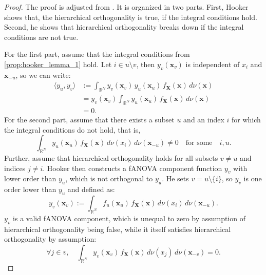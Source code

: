 \begin{proof}
    The proof is adjusted from \cite{hooker2007}. It is organized in two parts. First, Hooker shows that, the hierarchical orthogonality is true, if the integral conditions hold. Second, he shows that hierarchical orthogonality breaks down if the integral conditions are not true.\par
    For the first part, assume that the integral conditions from \autoref{prop:hooker_lemma_1} hold. Let $i \in u \setminus v$, then $y_v(\boldsymbol{x}_v)$ is independent of $x_i$ and $\boldsymbol{x}_{-u}$, so we can write:
\begin{align*}
\langle y_u, y_v \rangle 
&:= \int_{\mathbb{R}^N} 
        y_v(\boldsymbol{x}_v)\, y_u(\boldsymbol{x}_u)\, 
        f_{\boldsymbol{X}}(\boldsymbol{x})\, 
        d \nu(\boldsymbol{x}) \\[0.3em]
&= y_v(\boldsymbol{x}_v) 
   \int_{\mathbb{R}^N} 
        y_u(\boldsymbol{x}_u)\, 
        f_{\boldsymbol{X}}(\boldsymbol{x})\, 
        d \nu(\boldsymbol{x}) \\[0.3em]
&= 0.
\end{align*}
For the second part, assume that there exists a subset $u$ and an index $i$ for which the integral conditions do not hold, that is,
\begin{equation*}
    \int_{\mathbb{R}^N} y_u(\boldsymbol{x}_u)\, f_{\boldsymbol{X}}(\boldsymbol{x})\, d \nu (x_i)\, d \nu (\boldsymbol{x}_{-u}) \ne 0 
    \quad \text{for some} \quad i, u.
\end{equation*}
Further, assume that hierarchical orthogonality holds for all subsets $v \neq u$ and indices $j \neq i$. 
Hooker then constructs a fANOVA component function $y_v$ with lower order than $y_u$, which is not orthogonal to $y_u$. 
He sets $v = u \setminus \{i\}$, so $y_v$ is one order lower than $y_u$ and defined as:
\begin{equation*}
    y_v(\boldsymbol{x}_v) := \int_{\mathbb{R}^N} f_u(\boldsymbol{x}_u) \, f_{\boldsymbol{X}}(\boldsymbol{x}) \, d \nu (x_i) \, d \nu (\boldsymbol{x}_{-u}).
\end{equation*}
$y_v$ is a valid fANOVA component, which is unequal to zero by assumption of hierarchical orthogonality being false, while it itself satisfies hierarchical orthogonality by assumption:
\begin{equation*}
    \forall j \in v, \quad \int_{\mathbb{R}^N} y_v(\boldsymbol{x}_v) \, f_{\boldsymbol{X}}(\boldsymbol{x}) \, d \nu (x_j) \, d \nu (\boldsymbol{x}_{-v}) = 0.
\end{equation*}

\end{proof}

